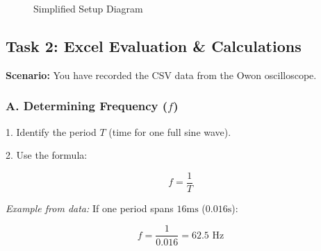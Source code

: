 \documentclass[a4paper,12pt]{article}
\begin{document}
\begin{figure}[h]

    \centering


    \caption{Simplified Setup Diagram}

\end{figure}



\subsection{Task 2: Excel Evaluation \& Calculations}

\textbf{Scenario:} You have recorded the CSV data from the Owon oscilloscope.



\subsubsection{A. Determining Frequency ($f$)}

1. Identify the period $T$ (time for one full sine wave).

2. Use the formula:

\begin{equation}

    f = \frac{1}{T}

\end{equation}

\textit{Example from data:} If one period spans $16 \text{ms}$ ($0.016 \text{s}$):

$$ f = \frac{1}{0.016} = 62.5 \text{ Hz} $$
\end{document}
